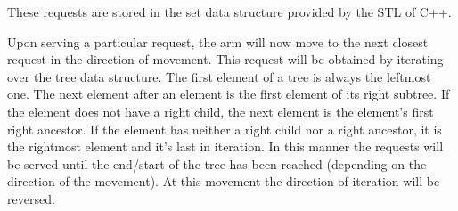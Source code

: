 \documentclass[11pt]{article}
\begin{document}
These requests are stored in the set data structure provided by the STL of C++.

Upon serving a particular request, the arm will now move to the next closest request in the direction of movement. This request will be obtained by iterating over the tree data structure. The first element of a tree is always the leftmost one. The next element after an element is the first element of its right subtree. If the element does not have a right child, the next element is the element's first right ancestor. If the element has neither a right child nor a right ancestor, it is the rightmost element and it's last in iteration. In this manner the requests will be served until the end/start of the tree has been reached (depending on the direction of the movement). At this movement the direction of iteration will be reversed. 
\end{document}
